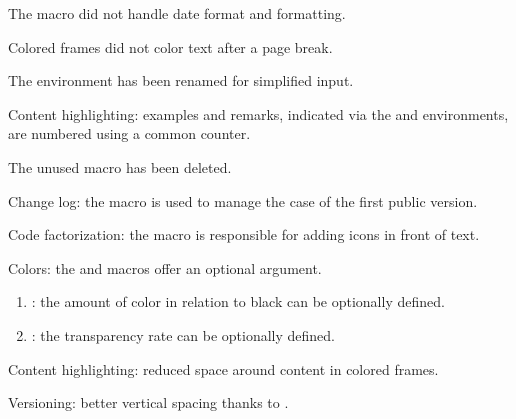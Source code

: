 \begin{tdocfix}
    \item The  macro did not handle date format and formatting.

    \item Colored frames did not color text after a page break.
\end{tdocfix}

\tdocsep




\begin{tdocbreak}[version = 1.4.0, date = 2024-09-28]
    \item The  environment has been renamed  for simplified input.

    \item Content highlighting: examples and remarks, indicated via the  and  environments, are numbered using a common counter.

    \item The unused macro  has been deleted.
\end{tdocbreak}


\begin{tdocnew}
    \item Change log: the  macro is used to manage the case of the first public version.

    \item Code factorization: the  macro is responsible for adding icons in front of text.
\end{tdocnew}


\begin{tdocupdate}
    \item Colors: the  and  macros offer an optional argument.
    \begin{enumerate}
        \item {}: the amount of color in relation to black can be optionally defined.

        \item {}: the transparency rate can be optionally defined.
    \end{enumerate}

    \item Content highlighting: reduced space around content in colored frames.

    \item Versioning: better vertical spacing thanks to .
\end{tdocupdate}

